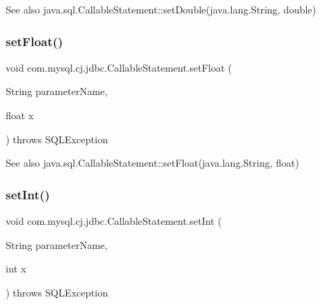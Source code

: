 \begin{DoxySeeAlso}{See also}
java.\+sql.\+Callable\+Statement\+::set\+Double(java.\+lang.\+String, double) 
\end{DoxySeeAlso}
\mbox{\label{classcom_1_1mysql_1_1cj_1_1jdbc_1_1_callable_statement_a419e74b589c54323627a2dbace2148c9}} 
\subsubsection{\texorpdfstring{set\+Float()}{setFloat()}}
{\footnotesize\ttfamily void com.\+mysql.\+cj.\+jdbc.\+Callable\+Statement.\+set\+Float (\begin{DoxyParamCaption}\item[{String}]{parameter\+Name,  }\item[{float}]{x }\end{DoxyParamCaption}) throws S\+Q\+L\+Exception}

\begin{DoxySeeAlso}{See also}
java.\+sql.\+Callable\+Statement\+::set\+Float(java.\+lang.\+String, float) 
\end{DoxySeeAlso}
\mbox{\label{classcom_1_1mysql_1_1cj_1_1jdbc_1_1_callable_statement_a7b7f13ec6ca2fe9dc40472b5334d1259}} 
\subsubsection{\texorpdfstring{set\+Int()}{setInt()}}
{\footnotesize\ttfamily void com.\+mysql.\+cj.\+jdbc.\+Callable\+Statement.\+set\+Int (\begin{DoxyParamCaption}\item[{String}]{parameter\+Name,  }\item[{int}]{x }\end{DoxyParamCaption}) throws S\+Q\+L\+Exception}

